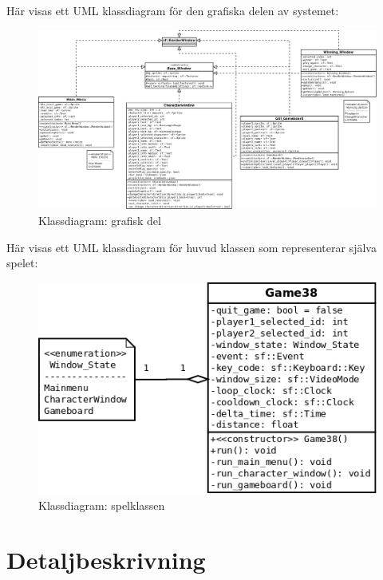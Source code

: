 \documentclass{TDP003mall}
\begin{document}
\newpage

Här visas ett UML klassdiagram för den grafiska delen av systemet:
\begin{figure}[H]
    \centering
    \includegraphics[width = \linewidth]{classdiagram_gui.png}
    \caption{Klassdiagram: grafisk del}
    \label{fig:classdiagram_gui}
\end{figure}

\newpage

Här visas ett UML klassdiagram för huvud klassen som representerar själva spelet:
\begin{figure}[H]
	\centering
	\includegraphics[width = \linewidth]{classdiagram_game.png}
	\caption{Klassdiagram: spelklassen}
	\label{fig:classdiagram_game}
\end{figure}

\newpage

\section{Detaljbeskrivning}
\end{document}
